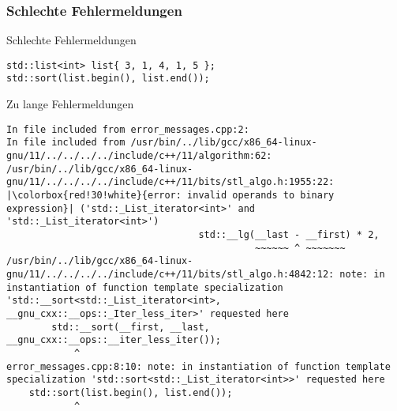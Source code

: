 \subsubsection{Schlechte Fehlermeldungen}

\begin{frame}[fragile]{Schlechte Fehlermeldungen}

    \begin{verbatim}
std::list<int> list{ 3, 1, 4, 1, 5 };
std::sort(list.begin(), list.end());
    \end{verbatim}
\end{frame}

\setlength{\fboxsep}{0.1pt}
\begin{frame}{Zu lange Fehlermeldungen}
    \begin{verbatim}
In file included from error_messages.cpp:2:
In file included from /usr/bin/../lib/gcc/x86_64-linux-gnu/11/../../../../include/c++/11/algorithm:62:
/usr/bin/../lib/gcc/x86_64-linux-gnu/11/../../../../include/c++/11/bits/stl_algo.h:1955:22:
|\colorbox{red!30!white}{error: invalid operands to binary expression}| ('std::_List_iterator<int>' and 'std::_List_iterator<int>')
                                  std::__lg(__last - __first) * 2,
                                            ~~~~~~ ^ ~~~~~~~
/usr/bin/../lib/gcc/x86_64-linux-gnu/11/../../../../include/c++/11/bits/stl_algo.h:4842:12: note: in instantiation of function template specialization 'std::__sort<std::_List_iterator<int>, __gnu_cxx::__ops::_Iter_less_iter>' requested here
        std::__sort(__first, __last, __gnu_cxx::__ops::__iter_less_iter());
            ^
error_messages.cpp:8:10: note: in instantiation of function template specialization 'std::sort<std::_List_iterator<int>>' requested here
    std::sort(list.begin(), list.end());
            ^


\end{verbatim}
\end{frame}
